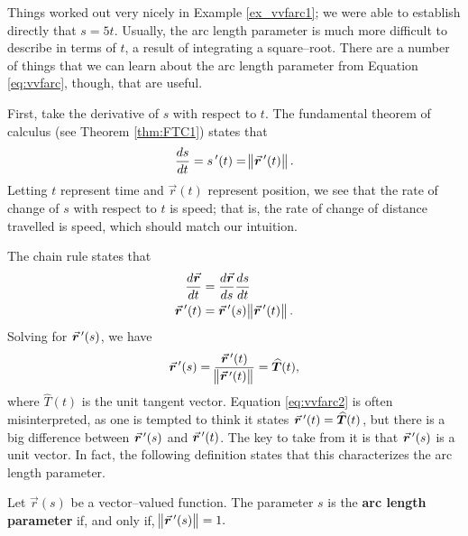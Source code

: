 Things worked out very nicely in Example \ref{ex_vvfarc1}; we were able to establish directly that $s=5t$. Usually, the arc length parameter is much more difficult to describe in terms of $t$, a result of integrating a square--root. There are a number of things that we can learn about the arc length parameter from Equation \eqref{eq:vvfarc}, though, that are useful.

First, %
take the derivative of $s$ with respect to $t$. The fundamental theorem of calculus (see Theorem \ref{thm:FTC1}) states that
\begin{equation}
\frac{ds}{dt}=s\,'(t) = \norm{\vrp(t)}.\label{eq:vvfarc3}
\end{equation}
Letting $t$ represent time and $\vec r(t)$ represent position, we see that the rate of change of $s$ with respect to $t$ is speed; that is, the rate of change of distance travelled is speed, which should match our intuition.

The chain rule states that 
\begin{align*}
\frac{d\vec r}{dt} &= \frac{d\vec r}{ds}\frac{ds}{dt}\\
\vrp(t) &= \vrp(s) \norm{\vrp(t)}.
\end{align*}
Solving for $\vrp(s)$, we have 
\begin{equation}
\vrp(s) = \frac{\vrp(t)}{\norm{\vrp(t)}} = \widehat T(t),\label{eq:vvfarc2}
\end{equation}
where $\widehat T(t)$ is the unit tangent vector. Equation \eqref{eq:vvfarc2} is often misinterpreted, as one is tempted to think it states $\vrp(t) = \widehat T(t)$, but there is a big difference between $\vrp(s)$ and $\vrp(t)$. The key to take from it is that $\vrp(s)$ is a unit vector. In fact, the following definition states that this characterizes the arc length parameter.
	\checkoddpage
{}

\begin{definition}\label{thm:arclengthparam}
Let $\vec r(s)$ be a vector--valued function. The parameter $s$ is the \textbf{arc length parameter} if, and only if, $\norm{\vrp(s)} = 1.$
\end{definition}

